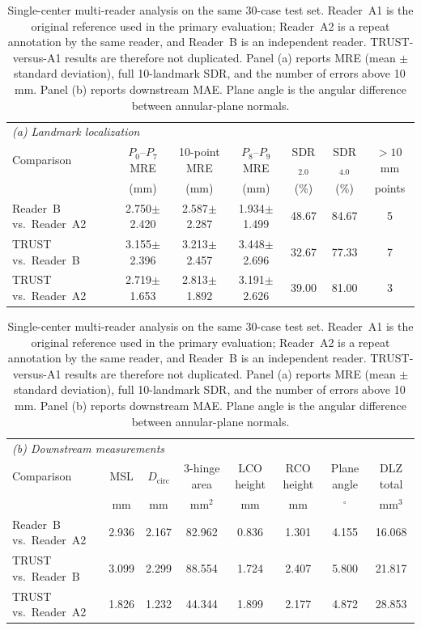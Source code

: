 \documentclass[conference]{IEEEtran}
\begin{document}
\begin{table}[!t]
\centering
\color{red}
\caption{Single-center multi-reader analysis on the same 30-case test set. Reader~A1 is the original reference used in the primary evaluation; Reader~A2 is a repeat annotation by the same reader, and Reader~B is an independent reader. TRUST-versus-A1 results are therefore not duplicated. Panel (a) reports MRE (mean $\pm$ standard deviation), full 10-landmark SDR, and the number of errors above 10\,mm. Panel (b) reports downstream MAE. Plane angle is the angular difference between annular-plane normals.}
\label{tab:multi_reader}
\setlength{\tabcolsep}{3pt}
\scriptsize
\begin{tabular}{l c c c c c c}
\toprule
\multicolumn{7}{l}{\textit{(a) Landmark localization}} \\
Comparison & $P_0$--$P_7$ MRE & 10-point MRE & $P_8$--$P_9$ MRE & SDR$_{2.0}$ & SDR$_{4.0}$ & $>10$\,mm \\
 & (mm) & (mm) & (mm) & (\%) & (\%) & points \\
\midrule
Reader~B vs.\ Reader~A2 & 2.750$\pm$2.420 & 2.587$\pm$2.287 & 1.934$\pm$1.499 & 48.67 & 84.67 & 5 \\
TRUST vs.\ Reader~B & 3.155$\pm$2.396 & 3.213$\pm$2.457 & 3.448$\pm$2.696 & 32.67 & 77.33 & 7 \\
TRUST vs.\ Reader~A2 & 2.719$\pm$1.653 & 2.813$\pm$1.892 & 3.191$\pm$2.626 & 39.00 & 81.00 & 3 \\
\bottomrule
\end{tabular}

\vspace{3pt}

\begin{tabular}{l c c c c c c c}
\toprule
\multicolumn{8}{l}{\textit{(b) Downstream measurements}} \\
Comparison & MSL & $D_{\text{circ}}$ & 3-hinge area & LCO height & RCO height & Plane angle & DLZ total \\
 & mm & mm & mm$^2$ & mm & mm & $^\circ$ & mm$^3$ \\
\midrule
Reader~B vs.\ Reader~A2 & 2.936 & 2.167 & 82.962 & 0.836 & 1.301 & 4.155 & 16.068 \\
TRUST vs.\ Reader~B & 3.099 & 2.299 & 88.554 & 1.724 & 2.407 & 5.800 & 21.817 \\
TRUST vs.\ Reader~A2 & 1.826 & 1.232 & 44.344 & 1.899 & 2.177 & 4.872 & 28.853 \\
\bottomrule
\end{tabular}
\end{table}
\end{document}
